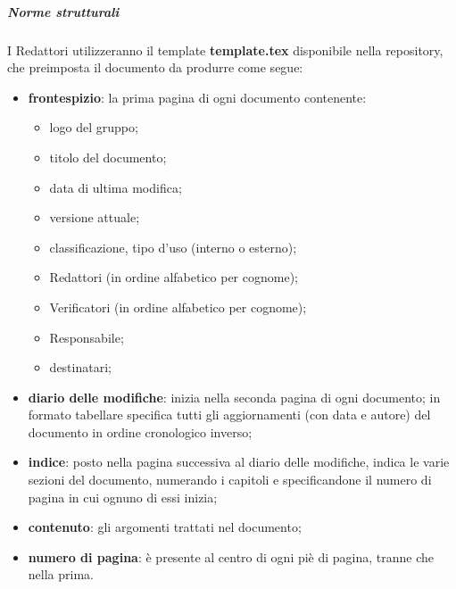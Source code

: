 		\subparagraph{Norme strutturali}
		I Redattori utilizzeranno il template \textbf{template.tex} disponibile nella repository, che preimposta il documento da produrre come segue:
		\begin{itemize}
			\item \textbf{frontespizio}: la prima pagina di ogni documento contenente:
			\begin{itemize}
				\item logo del gruppo;
				\item titolo del documento;
				\item data di ultima modifica;
				\item versione attuale;
				\item classificazione, tipo d'uso (interno o esterno);
				\item Redattori (in ordine alfabetico per cognome);
				\item Verificatori (in ordine alfabetico per cognome);
				\item Responsabile;
				\item destinatari;
			\end{itemize}
			\item \textbf{diario delle modifiche}: inizia nella seconda pagina di ogni documento; in formato tabellare specifica tutti gli aggiornamenti (con data e autore) del documento in ordine cronologico inverso;
			\item \textbf{indice}: posto nella pagina successiva al diario delle modifiche, indica le varie sezioni del documento, numerando i capitoli e specificandone il numero di pagina in cui ognuno di essi inizia;
			\item \textbf{contenuto}: gli argomenti trattati nel documento;
			\item \textbf{numero di pagina}: è presente al centro di ogni piè di pagina, tranne che nella prima.
		\end{itemize}
		
